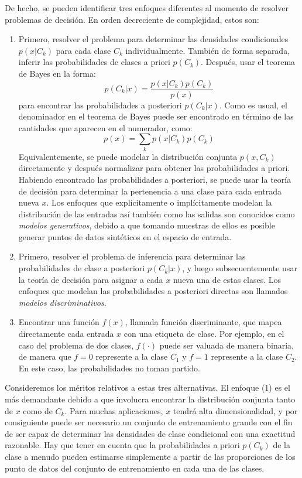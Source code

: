 	De hecho, se pueden identificar tres enfoques diferentes al momento de resolver problemas de decisión. En orden decreciente de complejidad, estos son:
		\begin{enumerate}
			\item Primero, resolver el problema para determinar las densidades condicionales $p(x \vert C_k)$ para cada clase $C_k$ individualmente. También de forma separada, inferir las probabilidades de clases a priori $p(C_k)$. Después, usar el teorema de Bayes en la forma:
			$$p(C_k \vert x) = \frac{p(x \vert C_k)p(C_k)}{p(x)} $$
			para encontrar las probabilidades a posteriori $p(C_k \vert x)$. Como es usual, el denominador en el teorema de Bayes puede ser encontrado en término de las cantidades que aparecen en el numerador, como:
			 $$p(x) = \sum_k p(x \vert C_k)p(C_k) $$
			Equivalentemente, se puede modelar la distribución conjunta $p(x,C_k)$ directamente y después normalizar para obtener las probabilidades a priori. Habiendo encontrado las probabilidades a posteriori, se puede usar la teoría de decisión para determinar la pertenencia a una clase para cada entrada nueva $x$. Los enfoques que explícitamente o implícitamente modelan la distribución de las entradas así también como las salidas son conocidos como \textit{modelos generativos}, debido a que tomando muestras de ellos es posible generar puntos de datos sintéticos en el espacio de entrada.
			\item Primero, resolver el problema de inferencia para determinar las  probabilidades de clase a posteriori $p(C_k \vert x)$, y luego subsecuentemente usar la teoría de decisión para asignar a cada $x$ nueva una de estas clases. Los enfoques que modelan las probabilidades a posteriori directas son llamados \textit{modelos discriminativos}.
			\item Encontrar una función $f(x)$, llamada función discriminante, que mapea directamente cada entrada $x$ con una etiqueta de clase. Por ejemplo, en el caso del problema de dos clases, $f(\cdot)$ puede ser valuada de manera binaria, de manera que $f = 0$ represente a la clase $C_1$ y $f = 1$ represente a la clase $C_2$. En este caso, las probabilidades no toman partido. 
		\end{enumerate}
		
	Consideremos los méritos relativos a estas tres alternativas. El enfoque (1) es el más demandante debido a que involucra encontrar la distribución conjunta tanto de $x$ como de $C_k$. Para muchas aplicaciones, $x$ tendrá alta dimensionalidad, y por consiguiente puede ser necesario un conjunto de entrenamiento grande con el fin de ser capaz de determinar las densidades de clase condicional con una exactitud razonable. Hay que tener en cuenta que la probabilidades a priori $p(C_k)$ de la clase a menudo pueden estimarse simplemente a partir de las proporciones de los punto de datos del conjunto de entrenamiento en cada una de las clases.
		
